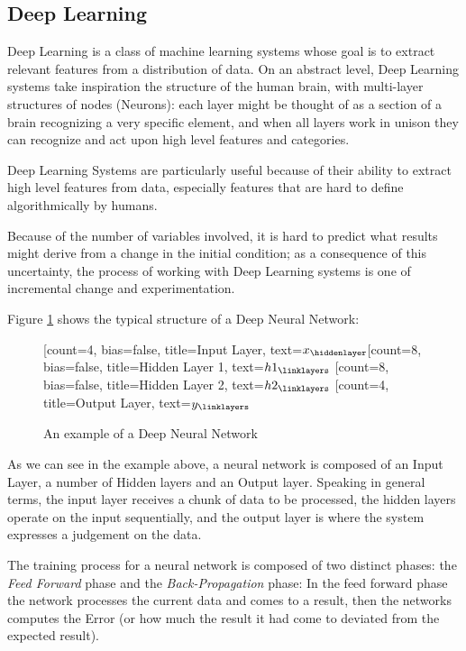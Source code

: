 \subsection{Deep Learning}\label{subsec:deep-learning}
Deep Learning is a class of machine learning systems whose goal is to extract relevant features from a distribution of data. On an abstract level, Deep Learning systems take inspiration the structure of the human brain, with multi-layer structures of nodes (Neurons): each layer might be thought of as a section of a brain recognizing a very specific element, and when all layers work in unison they can recognize and act upon high level features and categories.

Deep Learning Systems are particularly useful because of their ability to extract high level features from data, especially features that are hard to define algorithmically by humans.

Because of the number of variables involved, it is hard to predict what results might derive from a change in the initial condition; as a consequence of this uncertainty, the process of working with Deep Learning systems is one of incremental change and experimentation. 

Figure \ref{fig:DNN} shows the typical structure of a Deep Neural Network:
\begin{figure}[H]
\centering    
\begin{neuralnetwork}[height=8]
\newcommand{\x}[2]{$x_#2$}
\newcommand{\y}[2]{$y_#2$}
\newcommand{\hfirst}[2]{\small $h1_#2$}
\newcommand{\hsecond}[2]{\small $h2_#2$}
[count=4, bias=false, title=Input Layer, text=\x]
\hiddenlayer[count=8, bias=false, title=Hidden Layer 1, text=\hfirst] \linklayers
\hiddenlayer[count=8, bias=false, title=Hidden Layer 2, text=\hsecond] \linklayers
\outputlayer[count=4, title=Output Layer, text=\y] \linklayers
\end{neuralnetwork}
\caption{An example of a Deep Neural Network}\label{fig:DNN}
\end{figure}
As we can see in the example above, a neural network is composed of an Input Layer, a number of Hidden layers and an Output layer.
Speaking in general terms, the input layer receives a chunk of data to be processed, the hidden layers operate on the input sequentially, and the output layer is where the system expresses a judgement on the data.

The training process for a neural network is composed of two distinct phases: the \emph{Feed Forward} phase and the \emph{Back-Propagation} phase: In the feed forward phase the network processes the current data and comes to a result, then the networks computes the Error (or how much the result it had come to deviated from the expected result).

